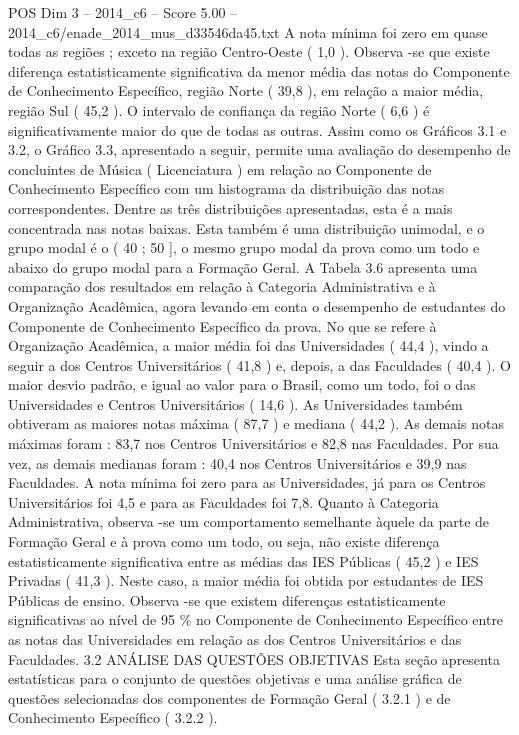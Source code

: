 \begin{textsample}{POS Dim 3 – 2014\_c6 – Score 5.00 – 2014\_c6/enade\_2014\_mus\_d33546da45.txt}
A nota mínima foi zero em quase todas as regiões ; exceto na região Centro-Oeste ( 1,0 ).
Observa -se que existe diferença estatisticamente significativa da menor média das notas do Componente de Conhecimento Específico, região Norte ( 39,8 ), em relação a maior média, região Sul ( 45,2 ).
O intervalo de confiança da região Norte ( 6,6 ) é significativamente maior do que de todas as outras.
Assim como os Gráficos 3.1 e 3.2, o Gráfico 3.3, apresentado a seguir, permite uma avaliação do desempenho de concluintes de Música ( Licenciatura ) em relação ao Componente de Conhecimento Específico com um histograma da distribuição das notas correspondentes.
Dentre as três distribuições apresentadas, esta é a mais concentrada nas notas baixas.
Esta também é uma distribuição unimodal, e o grupo modal é o ( 40 ; 50 ], o mesmo grupo modal da prova como um todo e abaixo do grupo modal para a Formação Geral.
A Tabela 3.6 apresenta uma comparação dos resultados em relação à Categoria Administrativa e à Organização Acadêmica, agora levando em conta o desempenho de estudantes do Componente de Conhecimento Específico da prova.
No que se refere à Organização Acadêmica, a maior média foi das Universidades ( 44,4 ), vindo a seguir a dos Centros Universitários ( 41,8 ) e, depois, a das Faculdades ( 40,4 ).
O maior desvio padrão, e igual ao valor para o Brasil, como um todo, foi o das Universidades e Centros Universitários ( 14,6 ).
As Universidades também obtiveram as maiores notas máxima ( 87,7 ) e mediana ( 44,2 ).
As demais notas máximas foram : 83,7 nos Centros Universitários e 82,8 nas Faculdades.
Por sua vez, as demais medianas foram : 40,4 nos Centros Universitários e 39,9 nas Faculdades.
A nota mínima foi zero para as Universidades, já para os Centros Universitários foi 4,5 e para as Faculdades foi 7,8.
Quanto à Categoria Administrativa, observa -se um comportamento semelhante àquele da parte de Formação Geral e à prova como um todo, ou seja, não existe diferença estatisticamente significativa entre as médias das IES Públicas ( 45,2 ) e IES Privadas ( 41,3 ).
Neste caso, a maior média foi obtida por estudantes de IES Públicas de ensino.
Observa -se que existem diferenças estatisticamente significativas ao nível de 95 \% no Componente de Conhecimento Específico entre as notas das Universidades em relação as dos Centros Universitários e das Faculdades. 3.2 ANÁLISE DAS QUESTÕES OBJETIVAS Esta seção apresenta estatísticas para o conjunto de questões objetivas e uma análise gráfica de questões selecionadas dos componentes de Formação Geral ( 3.2.1 ) e de Conhecimento Específico ( 3.2.2 ).

\end{textsample}

